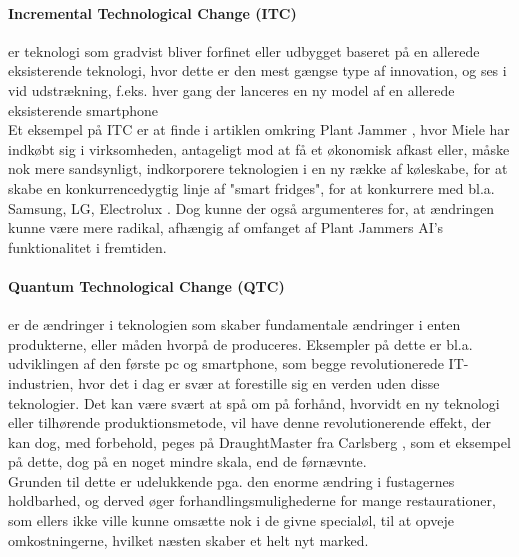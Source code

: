 \paragraph{Incremental Technological Change (ITC)} er teknologi som gradvist bliver forfinet eller udbygget baseret på en allerede
eksisterende teknologi, hvor dette er den mest gængse type af innovation, og ses i vid udstrækning, f.eks. hver gang der lanceres en ny model af en allerede eksisterende smartphone\\
Et eksempel på ITC er at finde i artiklen omkring Plant Jammer \cite[a.3]{eksamensopgave}, hvor Miele
har indkøbt sig i virksomheden, antageligt mod at få et økonomisk afkast eller, måske nok mere sandsynligt, indkorporere teknologien
i en ny række af køleskabe, for at skabe en konkurrencedygtig linje af "smart fridges", for at konkurrere med bl.a. Samsung, LG, Electrolux \cite{fridgemarketshare1, fridgemarketshare2}.
Dog kunne der også argumenteres for, at ændringen kunne være mere radikal, afhængig af omfanget af Plant Jammers AI's funktionalitet i fremtiden.
\\\paragraph{Quantum Technological Change (QTC)} er de ændringer i teknologien som skaber fundamentale ændringer i enten produkterne, eller måden hvorpå de produceres.
Eksempler på dette er bl.a. udviklingen af den første pc og smartphone, som begge revolutionerede IT-industrien, hvor det i dag er svær at forestille sig en verden
uden disse teknologier. Det kan være svært at spå om på forhånd, hvorvidt en ny teknologi eller tilhørende produktionsmetode, vil have denne revolutionerende effekt, der kan dog, med forbehold,
peges på DraughtMaster fra Carlsberg \cite[a.2]{eksamensopgave}, som et eksempel på dette, dog på en noget mindre skala, end de førnævnte.\\
Grunden til dette er udelukkende pga. den enorme ændring i fustagernes holdbarhed, og derved øger forhandlingsmulighederne for mange restaurationer, som ellers ikke ville
kunne omsætte nok i de givne specialøl, til at opveje omkostningerne, hvilket næsten skaber et helt nyt marked.
